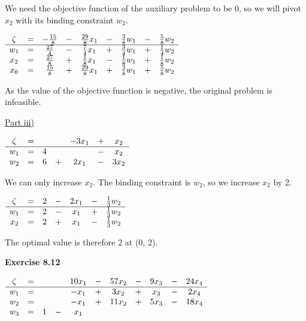 \documentclass[letterpaper,12pt]{article}
\begin{document}
We need the objective function of the auxiliary problem to be 0, so we will pivot $x_2$ with its binding constraint $w_2$.
\begin{center}
	$\begin{array}{ c c c c c c c c c c }
	\zeta & = & -\frac{15}{8} & - & \frac{29}{8}x_1 & - & \frac{3}{8}w_1 & - & \frac{5}{8}w_2 \\
	\hline
	w_1 & = & \frac{27}{4} & - & \frac{7}{4}x_1 & + & \frac{3}{4}w_1 & + & \frac{1}{4}w_2 \\
	x_2 & = & \frac{27}{8}  & + & \frac{1}{8}x_1 & - & \frac{1}{8}w_1 & + & \frac{1}{8}w_2 \\
	x_0 & = & \frac{15}{8}  & + & \frac{29}{8}x_1  & +  &  \frac{3}{8}w_1 & + & \frac{5}{8}w_2 \\
	\end{array}$ \\
\end{center}
As the value of the objective function is negative, the original problem is infeasible.

\underline{Part iii)}

\begin{center}
	$\begin{array}{ c c c c c c c c  }
	\zeta & = & & & -3x_1 & + & x_2 \\
	\hline
	w_1 & = & 4 & & & - & x_2 \\
	w_2 & = & 6 & + & 2x_1 & - & 3x_2 \\
	\end{array}$ \\
\end{center}

We can only increase $x_2$. The binding constraint is $w_2$, so we increase $x_2$ by 2.

\begin{center}
 	$\begin{array}{ c c c c c c c c  }
 	\zeta & = & 2 & - & 2x_1 & - & \frac{1}{3}w_2 \\
 	\hline
 	w_1 & = & 2 & - & x_1 & + & \frac{1}{3}w_2 \\
 	x_2 & = & 2 & + & x_1 & - & \frac{1}{3}w_2 \\
 	\end{array}$ \\
\end{center}

The optimal value is therefore 2 at (0, 2).

\textbf{Exercise 8.12}

\begin{center}
	$\begin{array}{ c c c c c c c c c c c c}
	\zeta & = & & & 10x_1 & - & 57x_2 & - & 9x_3 & - & 24x_4 \\
	\hline
	w_1 & = &  & & -x_1 & + & 3x_2 & + & x_3 & - & 2x_4 \\
	w_2 & = &  & & -x_1 & + & 11x_2 & + & 5x_3 & - & 18x_4 \\
	w_3 & = & 1 & - & x_1 & & & & & & \\
	\end{array}$ \\
\end{center}
\end{document}
